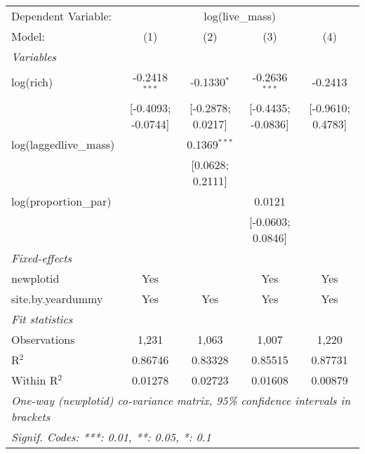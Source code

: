 \begin{tabular}{lcccc}
\tabularnewline\midrule\midrule
Dependent Variable:&\multicolumn{4}{c}{log(live\_mass)}\\
Model:&(1) & (2) & (3) & (4)\\
\midrule \emph{Variables}&   &   &   &  \\
log(rich)&-0.2418$^{***}$ & -0.1330$^{*}$ & -0.2636$^{***}$ & -0.2413\\
  &[-0.4093; -0.0744] & [-0.2878; 0.0217] & [-0.4435; -0.0836] & [-0.9610; 0.4783]\\
log(laggedlive\_mass)&   & 0.1369$^{***}$ &    &   \\
  &   & [0.0628; 0.2111] &    &   \\
log(proportion\_par)&   &    & 0.0121 &   \\
  &   &    & [-0.0603; 0.0846] &   \\
\midrule \emph{Fixed-effects}&   &   &   &  \\
newplotid & Yes &  & Yes & Yes\\
site.by.yeardummy & Yes & Yes & Yes & Yes\\
\midrule \emph{Fit statistics}&  & & & \\
Observations & 1,231&1,063&1,007&1,220\\
R$^2$ & 0.86746&0.83328&0.85515&0.87731\\
Within R$^2$ & 0.01278&0.02723&0.01608&0.00879\\
\midrule\midrule\multicolumn{5}{l}{\emph{One-way (newplotid) co-variance matrix, 95\% confidence intervals in brackets}}\\
\multicolumn{5}{l}{\emph{Signif. Codes: ***: 0.01, **: 0.05, *: 0.1}}\\
\end{tabular}


